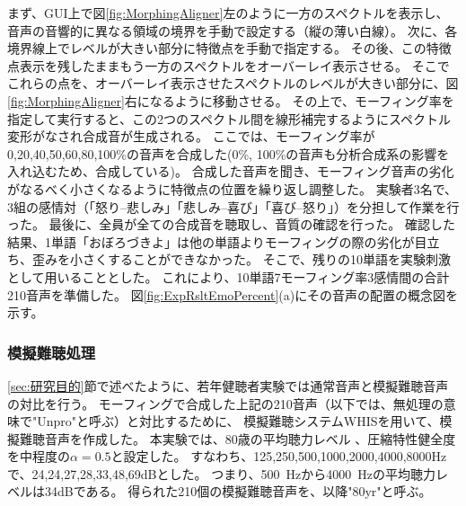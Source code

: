 まず、GUI上で図\ref{fig:MorphingAligner}左のように一方のスペクトルを表示し、音声の音響的に異なる領域の境界を手動で設定する（縦の薄い白線）。
次に、各境界線上でレベルが大きい部分に特徴点を手動で指定する。
その後、この特徴点表示を残したままもう一方のスペクトルをオーバーレイ表示させる。
そこでこれらの点を、オーバーレイ表示させたスペクトルのレベルが大きい部分に、図\ref{fig:MorphingAligner}右になるように移動させる。
その上で、モーフィング率を指定して実行すると、この2つのスペクトル間を線形補完するようにスペクトル変形がなされ合成音が生成される。
ここでは、モーフィング率が 0,20,40,50,60,80,100\%の音声を合成した(0\%, 100\%の音声も分析合成系の影響を入れ込むため、合成している)。
合成した音声を聞き、モーフィング音声の劣化がなるべく小さくなるように特徴点の位置を繰り返し調整した。
実験者3名で、3組の感情対（「怒り--悲しみ」「悲しみ--喜び」「喜び--怒り」）を分担して作業を行った。
最後に、全員が全ての合成音を聴取し、音質の確認を行った。
確認した結果、1単語「おぼろづきよ」は他の単語よりモーフィングの際の劣化が目立ち、歪みを小さくすることができなかった。
そこで、残りの10単語を実験刺激として用いることとした。
これにより、10単語\time 7モーフィング率\time 3感情間の合計210音声を準備した。
図\ref{fig:ExpRsltEmoPercent}(a)にその音声の配置の概念図を示す。






\subsubsection{模擬難聴処理}

\ref{sec:研究目的}節で述べたように、若年健聴者実験では通常音声と模擬難聴音声の対比を行う。
モーフィングで合成した上記の210音声（以下では、無処理の意味で"Unpro"と呼ぶ）と対比するために、
模擬難聴システムWHIS\cite{irino2023hearing}を用いて、模擬難聴音声を作成した。
本実験では、80歳の平均聴力レベル \cite{tsuiki2002nihon_Jpn}、圧縮特性健全度を中程度の$\alpha=0.5$と設定した。
すなわち、125,250,500,1000,2000,4000,8000Hzで、24,24,27,28,33,48,69dBとした。
つまり、500~Hzから4000~Hzの平均聴力レベルは34dBである。
得られた210個の模擬難聴音声を、以降"80yr"と呼ぶ。


